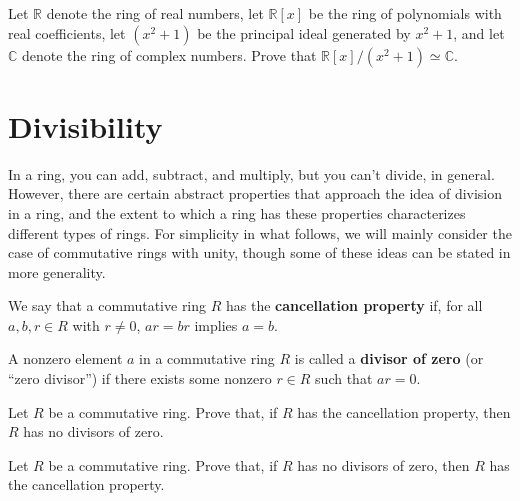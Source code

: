\begin{problem}\label{prob:cxnumintro}
Let \(\mathbb{R}\) denote the ring of real numbers, let \(\mathbb{R}[x]\) be the ring of polynomials with real coefficients, let \( (x^2+1) \) be the principal ideal generated by \(x^2+1\),  and let \(\mathbb{C}\) denote the ring of complex numbers. Prove that \(\mathbb{R}[x]/( x^2+1) \simeq \mathbb{C} \).
\begin{annotation}
\end{annotation}
\end{problem}

\chapter{Divisibility}\label{chap:divisible}
In a ring, you can add, subtract, and multiply, but you can't divide, in general. However, there are certain abstract properties that approach the idea of division in a ring, and the extent to which a ring has these properties characterizes different types of rings. For simplicity in what follows, we will mainly consider the case of commutative rings with unity, though some of these ideas can be stated in more generality.

\begin{definition}
We say that a commutative ring \(R\) has the \textbf{cancellation property} if, for all \(a, b, r \in R\) with \(r\neq 0\), \(ar = br\) implies \(a = b\).
\end{definition}

\begin{definition}
A nonzero element \(a\) in a commutative ring \(R\) is called a \textbf{divisor of zero} (or ``zero divisor'') if there exists some nonzero \(r \in R\) such that \(ar = 0\).
\end{definition}

\begin{problem}
Let \(R\) be a commutative ring. Prove that, if \(R\) has the cancellation property, then \(R\) has no divisors of zero.
\end{problem}

\begin{problem}
Let \(R\) be a commutative ring. Prove that, if \(R\) has no divisors of zero, then \(R\) has the cancellation property.
\end{problem}

